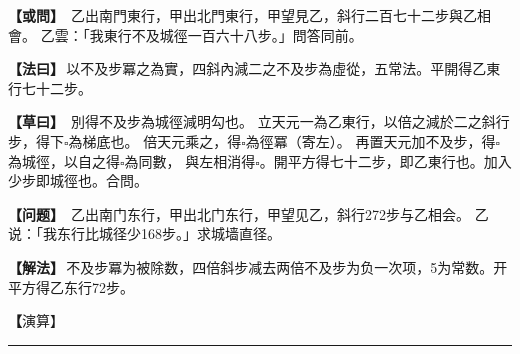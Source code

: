 \documentclass[11pt,a4paper]{article}
\let\origsquare\square
\renewcommand{\square}{\ensuremath{\origsquare}}%
\newcommand{\longline}{\noindent\rule{\textwidth}{0.4pt}}
\newcommand{\clOWEN}[1]{%
  \par\vspace{0.3em}%
  \noindent\textcolor{problemcolor}{\textbf{【或問】}}\,{\tradfont #1}\par\nopagebreak%
}
\newcommand{\mdOWEN}[1]{%
  \par\vspace{0.3em}%
  \noindent\textcolor{problemcolor}{\textbf{【问题】}}\,{\modfont #1}\par\nopagebreak%
}
\newcommand{\clFAYUE}[1]{%
  \par\noindent\textcolor{methodcolor}{\textbf{【法曰】}}\,{\tradfont #1}\par\nopagebreak%
}
\newcommand{\mdFAYUE}[1]{%
  \par\noindent\textcolor{methodcolor}{\textbf{【解法】}}\,{\modfont #1}\par\nopagebreak%
}
\newcommand{\clTSAOYUE}[1]{%
  \par\noindent\textcolor{workcolor}{\textbf{【草曰】}}\,{\tradfont #1}\par%
}
\newcommand{\mdTSAOYUE}[1]{%
  \par\noindent\textcolor{workcolor}{\textbf【演算】}}\,{\modfont #1}\par%
\begin{document}
\begin{paracol}{2}

\begin{leftcolumn}
\clOWEN{%
乙出南門東行，甲出北門東行，甲望見乙，斜行二百七十二步與乙相會。
乙雲：「我東行不及城徑一百六十八步。」問答同前。}

\clFAYUE{以不及步冪之為實，四斜內減二之不及步為虛從，五常法。平開得乙東行七十二步。}

\clTSAOYUE{%
別得不及步為城徑減明勾也。
立天元一為乙東行，以倍之減於二之斜行步，得下$\square$為梯底也。
倍天元乘之，得$\square$為徑冪（寄左）。
再置天元加不及步，得$\square$為城徑，以自之得$\square$為同數，
與左相消得$\square$。開平方得七十二步，即乙東行也。加入少步即城徑也。合問。}
\end{leftcolumn}

\switchcolumn

\begin{rightcolumn}
\mdOWEN{%
乙出南门东行，甲出北门东行，甲望见乙，斜行272步与乙相会。
乙说：「我东行比城径少168步。」求城墙直径。}

\mdFAYUE{不及步冪为被除数，四倍斜步减去两倍不及步为负一次项，5为常数。开平方得乙东行72步。}

\mdTSAOYUE{%
辨识得：不及步为城径减明勾。
设天元一为乙东行，两倍后从两倍斜行步中减去，得下式$\square$为梯底。
两倍天元乘之，得$\square$为径冪（寄左）。
再置天元加不及步，得$\square$为城径，自乘得$\square$为同数，
与左式相消得$\square$。开平方得72步，即乙东行。加入少步即城径。符合所问。}
\end{rightcolumn}

\end{paracol}

\vspace{0.3cm}
\begin{center}\longline\end{center}
\end{document}
